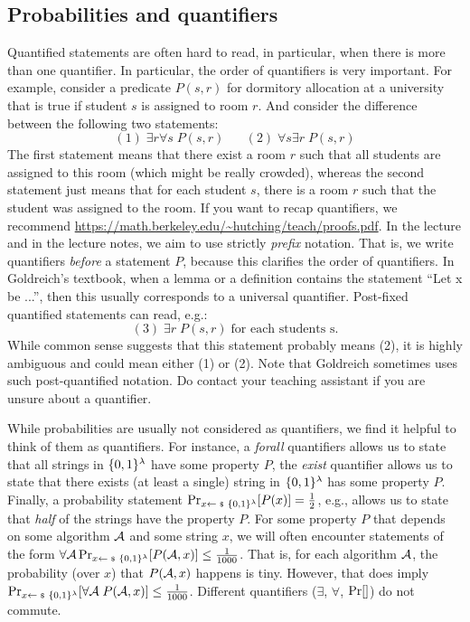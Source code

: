 \documentclass[a4paper,table,dvipsnames]{article}
\theoremstyle{definition}
\begin{document}
\subsection{Probabilities and quantifiers}\label{subsec:probabilities}
Quantified statements are often hard to read, in particular, when there is more than one quantifier. In particular, the order of quantifiers is very important. For example, consider a predicate $P(s,r)$ for dormitory allocation at a university that is true if student $s$ is assigned to room $r$. And consider the difference between the following two statements:
\[(1)\;\exists r\forall s\;P(s,r)\;\;\;\;\;\;(2)\;\forall s \exists r\;P(s,r)\]
The first statement means that there exist a room $r$ such that all students are assigned to this room (which might be really crowded), whereas the second statement just means that for each student $s$, there is a room $r$ such that the student was assigned to the room. If you want to recap quantifiers, we recommend \url{https://math.berkeley.edu/~hutching/teach/proofs.pdf}.
In the lecture and in the lecture notes, we aim to use strictly \emph{prefix} notation. That is, we write quantifiers \emph{before} a statement $P$, because this clarifies the order of quantifiers. In Goldreich's textbook, when a lemma or a definition contains the statement ``Let x be ...'', then this usually corresponds to a universal quantifier. Post-fixed quantified statements can read, e.g.:
\[(3)\;\exists r\;P(s,r)\;\text{for each students s.}\]
While common sense suggests that this statement probably means (2), it is highly ambiguous and could mean either (1) or (2). Note that Goldreich sometimes uses such post-quantified notation. Do contact your teaching assistant if you are unsure about a quantifier.

While probabilities are usually not considered as quantifiers, we find it helpful to think of them as quantifiers. For instance, a \emph{forall} quantifiers allows us to state that all strings in $\{0,1\}^\lambda$ have some property $P$, the \emph{exist} quantifier allows us to state that there exists (at least a single) string in $\{0,1\}^\lambda$ has some property $P$. Finally, a probability statement $\probsub{x\sample\bin^\lambda}{P(x)}=\tfrac12$, e.g., allows us to state that \emph{half} of the strings have the property $P$. For some property $P$ that depends on some algorithm $\mathcal{A}$ and some string $x$, we will often encounter statements of the form $\forall \adv \probsub{x\sample\bin^\lambda}{P(\adv,x)}\leq\tfrac{1}{1000}$. That is, for each algorithm $\mathcal{A}$, the probability (over $x$) that $P(\mathcal{A},x)$ happens is tiny. However, that does imply $\probsub{x\sample\bin^\lambda}{\forall \adv\; P(\adv,x)}\leq\tfrac{1}{1000}$. Different quantifiers ($\exists$, $\forall$, $\prob{}$) do not commute.
\end{document}
